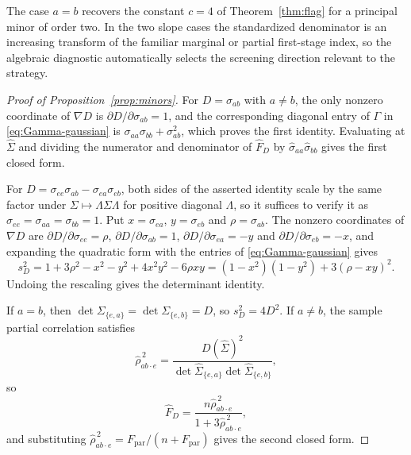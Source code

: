 \documentclass[12pt,a4paper]{article}
\theoremstyle{plain}
\theoremstyle{definition}
\newcommand{\Sighat}{\hat{\Sigma}}
\newcommand{\FD}{\widehat{F}_D}
\begin{document}
The case $a=b$ recovers the constant $c=4$ of Theorem~\ref{thm:flag} for a principal minor of order two.
In the two slope cases the standardized denominator is an increasing transform of the familiar marginal or partial first-stage index, so the algebraic diagnostic automatically selects the screening direction relevant to the strategy.

\begin{proof}[Proof of Proposition~\ref{prop:minors}]
    For $D=\sigma_{ab}$ with $a\ne b$, the only nonzero coordinate of $\nabla D$ is $\partial D/\partial\sigma_{ab}=1$, and the corresponding diagonal entry of $\Gamma$ in \eqref{eq:Gamma-gaussian} is $\sigma_{aa}\sigma_{bb}+\sigma_{ab}^2$, which proves the first identity.
    Evaluating at $\Sighat$ and dividing the numerator and denominator of $\FD$ by $\hat{\sigma}_{aa}\hat{\sigma}_{bb}$ gives the first closed form.
    
    For $D=\sigma_{ee}\sigma_{ab}-\sigma_{ea}\sigma_{eb}$, both sides of the asserted identity scale by the same factor under $\Sigma\mapsto\Lambda\Sigma\Lambda$ for positive diagonal $\Lambda$, so it suffices to verify it as $\sigma_{ee}=\sigma_{aa}=\sigma_{bb}=1$.
    Put $x=\sigma_{ea}$, $y=\sigma_{eb}$ and $\rho=\sigma_{ab}$.
    The nonzero coordinates of $\nabla D$ are $\partial D/\partial\sigma_{ee}=\rho$, $\partial D/\partial\sigma_{ab}=1$, $\partial D/\partial\sigma_{ea}=-y$ and $\partial D/\partial\sigma_{eb}=-x$, and expanding the quadratic form with the entries of \eqref{eq:Gamma-gaussian} gives
    \begin{equation*}
        s_D^2
        =
        1+3\rho^2-x^2-y^2+4x^2y^2-6\rho xy
        =
        (1-x^2)(1-y^2)+3(\rho-xy)^2
        .
    \end{equation*}
    Undoing the rescaling gives the determinant identity.

    If $a=b$, then $\det\Sigma_{\{e,a\}}=\det\Sigma_{\{e,b\}}=D$, so $s_D^2=4D^2$.
    If $a\ne b$, the sample partial correlation satisfies
    \begin{equation*}
        \hat{\rho}_{ab\cdot e}^{\,2}
        =
        \frac{D(\Sighat)^2}{\det\Sighat_{\{e,a\}}\det\Sighat_{\{e,b\}}}
        ,
    \end{equation*}
    so
    \begin{equation*}
        \FD
        =
        \frac{n\hat{\rho}_{ab\cdot e}^{\,2}}{1+3\hat{\rho}_{ab\cdot e}^{\,2}}
        ,
    \end{equation*}
    and substituting $\hat{\rho}_{ab\cdot e}^{\,2}=F_{\mathrm{par}}/(n+F_{\mathrm{par}})$ gives the second closed form.
\end{proof}
\end{document}
